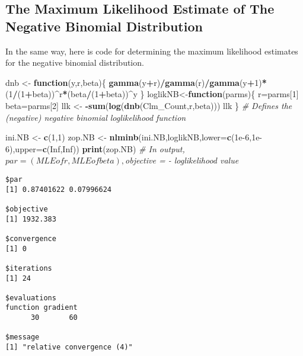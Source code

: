 \documentclass[]{book}
\newenvironment{Shaded}{\begin{snugshade}}{\end{snugshade}}
\newcommand{\KeywordTok}[1]{\textcolor[rgb]{0.13,0.29,0.53}{\textbf{#1}}}
\newcommand{\DataTypeTok}[1]{\textcolor[rgb]{0.13,0.29,0.53}{#1}}
\newcommand{\DecValTok}[1]{\textcolor[rgb]{0.00,0.00,0.81}{#1}}
\newcommand{\FloatTok}[1]{\textcolor[rgb]{0.00,0.00,0.81}{#1}}
\newcommand{\StringTok}[1]{\textcolor[rgb]{0.31,0.60,0.02}{#1}}
\newcommand{\CommentTok}[1]{\textcolor[rgb]{0.56,0.35,0.01}{\textit{#1}}}
\newcommand{\OtherTok}[1]{\textcolor[rgb]{0.56,0.35,0.01}{#1}}
\newcommand{\ControlFlowTok}[1]{\textcolor[rgb]{0.13,0.29,0.53}{\textbf{#1}}}
\newcommand{\OperatorTok}[1]{\textcolor[rgb]{0.81,0.36,0.00}{\textbf{#1}}}
\newcommand{\NormalTok}[1]{#1}
\theoremstyle{definition}
\theoremstyle{definition}
\theoremstyle{definition}
\theoremstyle{remark}
\begin{document}
\subsection{The Maximum Likelihood Estimate of The Negative Binomial
Distribution}\label{the-maximum-likelihood-estimate-of-the-negative-binomial-distribution}

In the same way, here is code for determining the maximum likelihood
estimates for the negative binomial distribution.

\begin{Shaded}
\begin{Highlighting}[]
\NormalTok{dnb <-}\StringTok{ }\ControlFlowTok{function}\NormalTok{(y,r,beta)\{}
  \KeywordTok{gamma}\NormalTok{(y}\OperatorTok{+}\NormalTok{r)}\OperatorTok{/}\KeywordTok{gamma}\NormalTok{(r)}\OperatorTok{/}\KeywordTok{gamma}\NormalTok{(y}\OperatorTok{+}\DecValTok{1}\NormalTok{)}\OperatorTok{*}\NormalTok{(}\DecValTok{1}\OperatorTok{/}\NormalTok{(}\DecValTok{1}\OperatorTok{+}\NormalTok{beta))}\OperatorTok{^}\NormalTok{r}\OperatorTok{*}\NormalTok{(beta}\OperatorTok{/}\NormalTok{(}\DecValTok{1}\OperatorTok{+}\NormalTok{beta))}\OperatorTok{^}\NormalTok{y}
\NormalTok{\}}
\NormalTok{loglikNB<-}\ControlFlowTok{function}\NormalTok{(parms)\{ }
\NormalTok{  r=parms[}\DecValTok{1}\NormalTok{]}
\NormalTok{  beta=parms[}\DecValTok{2}\NormalTok{]}
\NormalTok{  llk <-}\StringTok{ }\OperatorTok{-}\KeywordTok{sum}\NormalTok{(}\KeywordTok{log}\NormalTok{(}\KeywordTok{dnb}\NormalTok{(Clm_Count,r,beta)))}
\NormalTok{  llk}
\NormalTok{\} }\CommentTok{# Defines the (negative) negative binomial loglikelihood function}

\NormalTok{ini.NB <-}\StringTok{ }\KeywordTok{c}\NormalTok{(}\DecValTok{1}\NormalTok{,}\DecValTok{1}\NormalTok{)}
\NormalTok{zop.NB <-}\StringTok{ }\KeywordTok{nlminb}\NormalTok{(ini.NB,loglikNB,}\DataTypeTok{lower=}\KeywordTok{c}\NormalTok{(}\FloatTok{1e-6}\NormalTok{,}\FloatTok{1e-6}\NormalTok{),}\DataTypeTok{upper=}\KeywordTok{c}\NormalTok{(}\OtherTok{Inf}\NormalTok{,}\OtherTok{Inf}\NormalTok{))}
\KeywordTok{print}\NormalTok{(zop.NB) }\CommentTok{# In output, $par = (MLE of r, MLE of beta), $objective = - loglikelihood value}
\end{Highlighting}
\end{Shaded}

\begin{verbatim}
$par
[1] 0.87401622 0.07996624

$objective
[1] 1932.383

$convergence
[1] 0

$iterations
[1] 24

$evaluations
function gradient 
      30       60 

$message
[1] "relative convergence (4)"
\end{verbatim}
\end{document}
